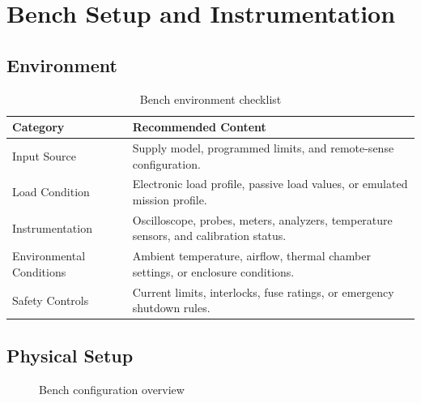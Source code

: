 \section{Bench Setup and Instrumentation}

\subsection{Environment}
\begin{table}[H]
    \centering
    \small
    \begin{tabular}{l p{9.7cm}}
        \toprule
        \textbf{Category} & \textbf{Recommended Content} \\
        \midrule
        Input Source & Supply model, programmed limits, and remote-sense configuration. \\
        Load Condition & Electronic load profile, passive load values, or emulated mission profile. \\
        Instrumentation & Oscilloscope, probes, meters, analyzers, temperature sensors, and calibration status. \\
        Environmental Conditions & Ambient temperature, airflow, thermal chamber settings, or enclosure conditions. \\
        Safety Controls & Current limits, interlocks, fuse ratings, or emergency shutdown rules. \\
        \bottomrule
    \end{tabular}
    \caption{Bench environment checklist}
    \label{tab:bench-environment}
\end{table}

\subsection{Physical Setup}
\begin{figure}[H]
    \centering
    \caption{Bench configuration overview}
    \label{fig:test-bench}
\end{figure}

